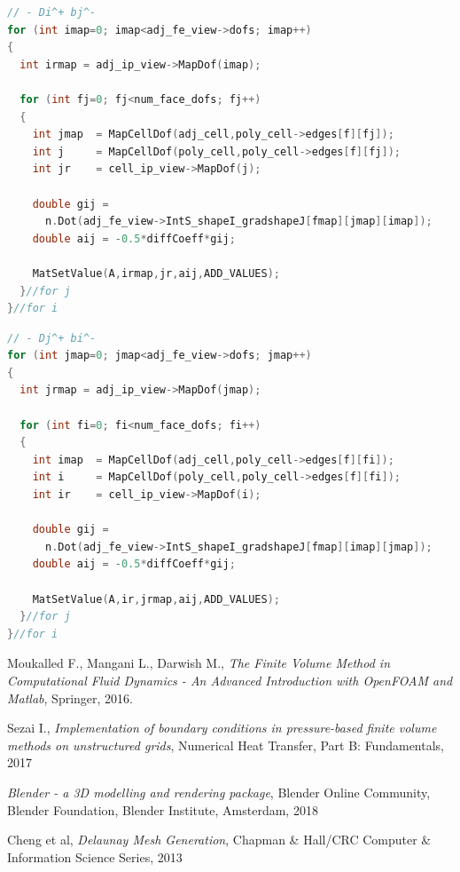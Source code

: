 \documentclass[11pt,letterpaper,titlepage]{article}
\numberwithin{equation}{section}
\begin{document}
\vspace{0.25cm}
\begin{lstlisting}[language=c++]
// - Di^+ bj^-
for (int imap=0; imap<adj_fe_view->dofs; imap++)
{
  int irmap = adj_ip_view->MapDof(imap);

  for (int fj=0; fj<num_face_dofs; fj++)
  {
    int jmap  = MapCellDof(adj_cell,poly_cell->edges[f][fj]);
    int j     = MapCellDof(poly_cell,poly_cell->edges[f][fj]);
    int jr    = cell_ip_view->MapDof(j);

    double gij =
      n.Dot(adj_fe_view->IntS_shapeI_gradshapeJ[fmap][jmap][imap]);
    double aij = -0.5*diffCoeff*gij;

    MatSetValue(A,irmap,jr,aij,ADD_VALUES);
  }//for j
}//for i
\end{lstlisting}

\vspace{0.25cm}
\begin{lstlisting}[language=c++]
// - Dj^+ bi^-
for (int jmap=0; jmap<adj_fe_view->dofs; jmap++)
{
  int jrmap = adj_ip_view->MapDof(jmap);

  for (int fi=0; fi<num_face_dofs; fi++)
  {
    int imap  = MapCellDof(adj_cell,poly_cell->edges[f][fi]);
    int i     = MapCellDof(poly_cell,poly_cell->edges[f][fi]);
    int ir    = cell_ip_view->MapDof(i);

    double gij =
      n.Dot(adj_fe_view->IntS_shapeI_gradshapeJ[fmap][imap][jmap]);
    double aij = -0.5*diffCoeff*gij;

    MatSetValue(A,ir,jrmap,aij,ADD_VALUES);
  }//for j
}//for i
\end{lstlisting}

\newpage
{}
\begin{thebibliography}{1}
    
     Moukalled F., Mangani L., Darwish M., {\em The Finite Volume Method in Computational Fluid Dynamics - An Advanced Introduction with OpenFOAM and Matlab}, Springer, 2016.
    
     Sezai I., {\em Implementation of boundary conditions in pressure-based finite volume methods on unstructured grids}, Numerical Heat Transfer, Part B: Fundamentals, 2017
    
     {\em Blender - a 3D modelling and rendering package}, Blender Online Community, Blender Foundation, Blender Institute, Amsterdam, 2018
    
     Cheng et al, {\em Delaunay Mesh Generation}, Chapman \& Hall/CRC Computer \& Information Science Series, 2013
    
    
\end{thebibliography}
\end{document}
